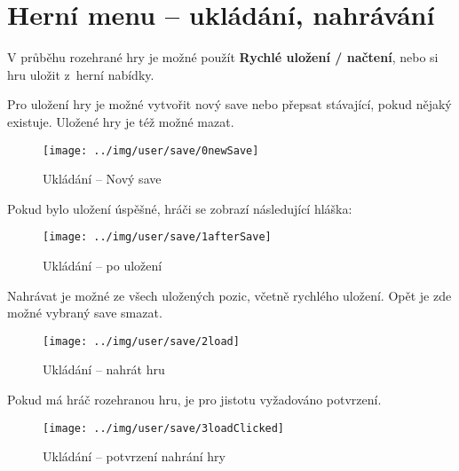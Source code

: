 
\section{Herní menu -- ukládání, nahrávání}

V průběhu rozehrané hry je možné použít \textbf{Rychlé uložení / načtení}, nebo si hru uložit z~herní nabídky.

Pro uložení hry je možné vytvořit nový save nebo přepsat stávající, pokud nějaký existuje. Uložené hry je též možné mazat.

\begin{figure}[!ht]\centering
\texttt{[image: ../img/user/save/0newSave]}

\caption{Ukládání -- Nový save}
\label{fig:user_save_0newSave}

\end{figure}
\FloatBarrier

Pokud bylo uložení úspěšné, hráči se zobrazí následující hláška:

\begin{figure}[!ht]\centering
\texttt{[image: ../img/user/save/1afterSave]}

\caption{Ukládání -- po uložení}
\label{fig:user_save_1afterSave}

\end{figure}
\FloatBarrier

Nahrávat je možné ze všech uložených pozic, včetně rychlého uložení. Opět je zde možné vybraný save smazat.

\begin{figure}[!ht]\centering
\texttt{[image: ../img/user/save/2load]}

\caption{Ukládání -- nahrát hru}
\label{fig:user_save_2load}

\end{figure}
\FloatBarrier

Pokud má hráč rozehranou hru, je pro jistotu vyžadováno potvrzení.

\begin{figure}[!ht]\centering
\texttt{[image: ../img/user/save/3loadClicked]}

\caption{Ukládání -- potvrzení nahrání hry}
\label{fig:user_save_3loadClicked}

\end{figure}

\FloatBarrier